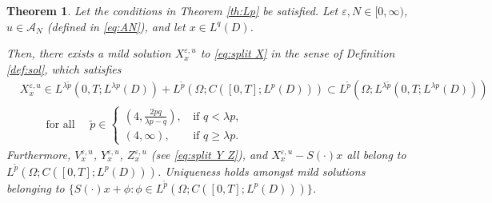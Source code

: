 \documentclass[10pt,a4paper]{amsart}
\newtheorem{theorem}{Theorem}[section]
\numberwithin{equation}{section}
\newcommand{\eps}{\varepsilon}
\newcommand{\Om}{\Omega}
\newcommand{\A}{{\mathcal A}}
\begin{document}
\begin{theorem}\label{th:wpnLp}
Let the conditions in Theorem \ref{th:Lp} be satisfied. Let $\eps,N\in[0,\infty)$,   $u\in \A_N$ (defined in \eqref{eq:AN}), and let $x\in L^q(D)$. 

Then, there exists a mild solution $X_x^{\eps,u}$ to \eqref{eq:split X} in the sense of Definition \ref{def:sol}, which  satisfies 
\begin{align*}
&X_x^{\eps,u}\in L^{\lambda \tilde p}(0,T;L^{\lambda p}(D))+ L^{\tilde{p}}(\Omega;C([0,T];L^p(D)))\subset L^{\tilde p}(\Om;L^{\lambda \tilde p}(0,T;L^{\lambda p}(D)))\\
&\qquad\text{ for all }\quad \tilde{p}\in
\begin{cases}
(4,\frac{2pq}{\lambda p-q}), \, &\text{if } q<\lambda p,\\
(4,\infty), &\text{if } q\geq \lambda p. 
\end{cases}
\end{align*}
 Furthermore, $V^{\eps,u}_x$, $Y^{\eps,u}_x$, $Z^{\eps,u}_x$ (see  \eqref{eq:split Y Z}), and $X^{\eps,u}_x -S(\cdot)x$   all belong to  $L^{\tilde{p}}(\Omega;C([0,T];L^p(D)))$.  
 Uniqueness holds amongst mild solutions belonging to $\{S(\cdot)x+\phi:\phi\in L^{\tilde p}(\Om;C([0,T];L^p(D)))\}$. 
\end{theorem}
\end{document}
